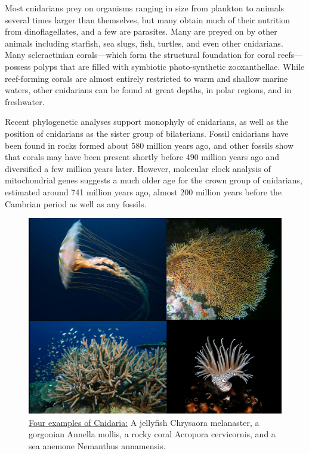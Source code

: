 \twocolumn

Most cnidarians prey on organisms ranging in size from plankton to animals several times larger than themselves, but many obtain much of their nutrition from dinoflagellates, and a few are parasites. Many are preyed on by other animals including starfish, sea slugs, fish, turtles, and even other cnidarians. Many scleractinian corals---which form the structural foundation for coral reefs---possess polyps that are filled with symbiotic photo-synthetic zooxanthellae. While reef-forming corals are almost entirely restricted to warm and shallow marine waters, other cnidarians can be found at great depths, in polar regions, and in freshwater.

Recent phylogenetic analyses support monophyly of cnidarians, as well as the position of cnidarians as the sister group of bilaterians. Fossil cnidarians have been found in rocks formed about 580 million years ago, and other fossils show that corals may have been present shortly before 490 million years ago and diversified a few million years later. However, molecular clock analysis of mitochondrial genes suggests a much older age for the crown group of cnidarians, estimated around 741 million years ago, almost 200 million years before the Cambrian period as well as any fossils.



\begin{figure}

{\centering \includegraphics[width=0.7\linewidth]{./figures/animals/Cnidaria} 

}

\caption{\href{https://commons.wikimedia.org/wiki/File:Cnidaria.png}{Four examples of Cnidaria:} A jellyfish Chrysaora melanaster, a gorgonian Annella mollis, a rocky coral Acropora cervicornis, and a sea anemone Nemanthus annamensis.}\label{fig:cnidaria}
\end{figure}

